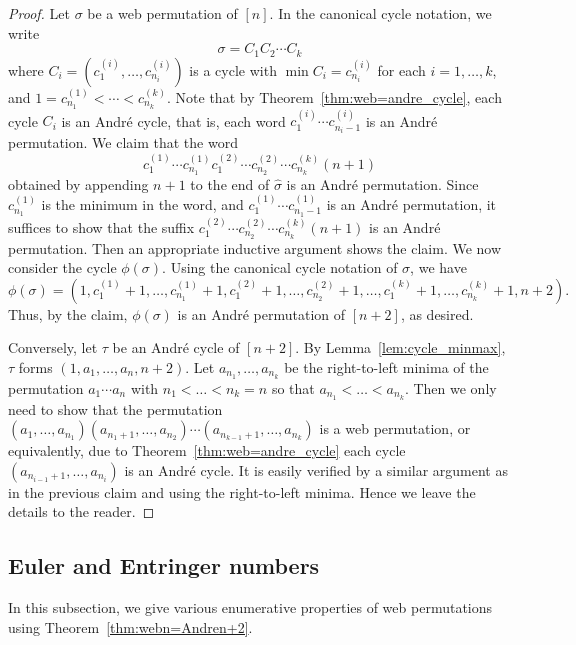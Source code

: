 \documentclass[reqno,12pt]{amsart}
\theoremstyle{definition}
\theoremstyle{remark}
\begin{document}
\begin{proof}
  Let $\sigma$ be a web permutation of \( [n] \).
  In the canonical cycle notation, we write 
  \[
    \sigma=C_1 C_2 \cdots C_k 
  \]
  where \( C_i = (c^{(i)}_{1}, \dots, c^{(i)}_{n_i}) \) is a cycle with $\min C_i = c^{(i)}_{n_i}$ for each \( i=1,\dots,k \), and $1=c^{(1)}_{n_1}<\cdots<c^{(k)}_{n_k}$.
  Note that by Theorem~\ref{thm:web=andre_cycle}, each cycle \( C_i \) is an
  Andr\'e cycle, that is, each word \( c^{(i)}_1\cdots c^{(i)}_{n_i-1} \) is
  an Andr\'e permutation.
  We claim that the word
  \[
    c^{(1)}_1\cdots c^{(1)}_{n_1} c^{(2)}_{1}\cdots c^{(2)}_{n_2}\cdots c^{(k)}_{n_k} (n+1)
  \] obtained by appending \( n+1 \) to the end of \( \widehat{\sigma} \)
  is an Andr\'e permutation.
  Since \( c^{(1)}_{n_1} \) is the minimum in the word, and
  \( c^{(1)}_1\cdots c^{(1)}_{n_1-1} \) is an Andr\'e permutation,
  it suffices to show that the suffix \( c^{(2)}_{1}\cdots c^{(2)}_{n_2}\cdots
  c^{(k)}_{n_k} (n+1) \) is an Andr\'e permutation.
  Then an appropriate inductive argument shows the claim.
  We now consider the cycle \( \phi(\sigma) \).
  Using the canonical cycle notation of \( \sigma \), we have
  \[
    \phi(\sigma)
    = (1,c^{(1)}_1+1,\dots, c^{(1)}_{n_1}+1,c^{(2)}_1 +1,\dots,c^{(2)}_{n_2}+1,\dots,c^{(k)}_1+1 ,\dots, c^{(k)}_{n_k}+1,n+2 ).
  \]
  Thus, by the claim, \(\phi(\sigma)\) is an Andr\'e permutation of \( [n+2] \),
  as desired.

  Conversely, let \( \tau \) be an Andr\'e cycle of \( [n+2] \).
  By Lemma~\ref{lem:cycle_minmax}, \( \tau \) forms \( (1,a_1,\dots,a_n, n+2) \).
  Let \( a_{n_1},\dots,a_{n_k} \) be the right-to-left minima of the permutation
  \( a_1\cdots a_n \) with \( n_1<\dots<n_k=n \) so that \( a_{n_1}<\dots<a_{n_k} \).
  Then we only need to show that the permutation
  \( (a_1,\dots,a_{n_1})(a_{n_1+1},\dots,a_{n_2})\cdots (a_{n_{k-1}+1},\dots,a_{n_k}) \)
  is a web permutation, or equivalently, due to Theorem~\ref{thm:web=andre_cycle}
  each cycle \( (a_{n_{i-1}+1},\dots,a_{n_i}) \) is an Andr\'e cycle.
  It is easily verified by a similar argument as in the previous claim and
  using the right-to-left minima.
  Hence we leave the details to the reader.
\end{proof}

\subsection{Euler and Entringer numbers}
In this subsection, we give various enumerative properties of
web permutations using Theorem~\ref{thm:webn=Andren+2}.
\end{document}
